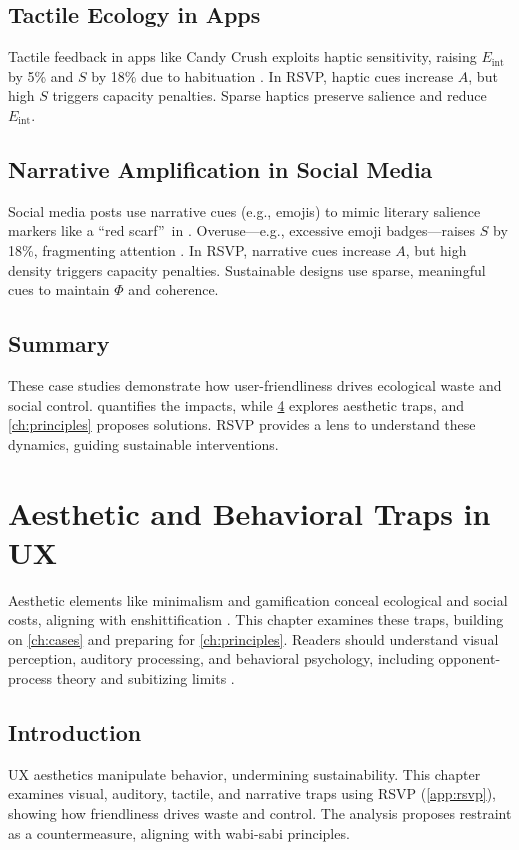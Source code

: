 \documentclass[openany]{book}
\newcommand{\PhiS}{\Phi} %
\newcommand{\Sent}{S} %
\newcommand{\Eint}{E_{\mathrm{int}}} %
\begin{document}
\section{Tactile Ecology in Apps}
\label{sec:cases-tactile}
Tactile feedback in apps like Candy Crush exploits haptic sensitivity, raising \(\Eint\) by 5\% and \(\Sent\) by 18\% due to habituation \citep{gallace2006}. In RSVP, haptic cues increase \(A\), but high \(\Sent\) triggers capacity penalties. Sparse haptics preserve salience and reduce \(\Eint\).

\section{Narrative Amplification in Social Media}
\label{sec:cases-narrative}
Social media posts use narrative cues (e.g., emojis) to mimic literary salience markers like a \textquotedblleft red scarf\textquotedblright\ in \citet{lewis1942}. Overuse---e.g., excessive emoji badges---raises \(\Sent\) by 18\%, fragmenting attention \citep{colak2024}. In RSVP, narrative cues increase \(A\), but high density triggers capacity penalties. Sustainable designs use sparse, meaningful cues to maintain \(\PhiS\) and coherence.

\section{Summary}
These case studies demonstrate how user-friendliness drives ecological waste and social control.  quantifies the impacts, while \cref{ch:aesthetic} explores aesthetic traps, and \cref{ch:principles} proposes solutions. RSVP provides a lens to understand these dynamics, guiding sustainable interventions.

\chapter{Aesthetic and Behavioral Traps in UX}
\label{ch:aesthetic}

Aesthetic elements like minimalism and gamification conceal ecological and social costs, aligning with enshittification \citep{doctorow2022}. This chapter examines these traps, building on \cref{ch:cases} and preparing for \cref{ch:principles}. Readers should understand visual perception, auditory processing, and behavioral psychology, including opponent-process theory \citep{hurvich1981} and subitizing limits \citep{kaufman1949}.

\section{Introduction}
\label{sec:aesthetic-intro}
UX aesthetics manipulate behavior, undermining sustainability. This chapter examines visual, auditory, tactile, and narrative traps using RSVP (\cref{app:rsvp}), showing how friendliness drives waste and control. The analysis proposes restraint as a countermeasure, aligning with wabi-sabi principles.
\end{document}
